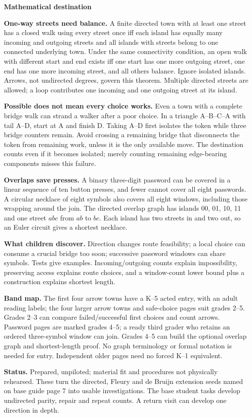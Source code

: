 \documentclass[11pt]{article}
\newcommand{\parttitle}[1]{{\large\bfseries\color{ink}#1}\par}
\newcommand{\labelled}[2]{\textbf{#1} #2\par}
\begin{document}
\parttitle{Mathematical destination}
\labelled{One-way streets need balance.}{A finite directed town with at least one street has a closed walk using every street once iff each island has equally many incoming and outgoing streets and all islands with streets belong to one connected underlying town. Under the same connectivity condition, an open walk with different start and end exists iff one start has one more outgoing street, one end has one more incoming street, and all others balance. Ignore isolated islands. Arrows, not undirected degrees, govern this theorem. Multiple directed streets are allowed; a loop contributes one incoming and one outgoing street at its island.}
\labelled{Possible does not mean every choice works.}{Even a town with a complete bridge walk can strand a walker after a poor choice. In a triangle A--B--C--A with tail A--D, start at A and finish D. Taking A--D first isolates the token while three bridge counters remain. Avoid crossing a remaining bridge that disconnects the token from remaining work, unless it is the only available move. The destination counts even if it becomes isolated; merely counting remaining edge-bearing components misses this failure.}
\labelled{Overlaps save presses.}{A binary three-digit password can be covered in a linear sequence of ten button presses, and fewer cannot cover all eight passwords. A circular necklace of eight symbols also covers all eight windows, including those wrapping around the join. The directed overlap graph has islands 00, 01, 10, 11 and one street $abc$ from $ab$ to $bc$. Each island has two streets in and two out, so an Euler circuit gives a shortest necklace.}
\labelled{What children discover.}{Direction changes route feasibility; a local choice can consume a crucial bridge too soon; successive password windows can share symbols. Tests give examples. Incoming/outgoing counts explain impossibility, preserving access explains route choices, and a window-count lower bound plus a construction explains shortest length.}
\labelled{Band map.}{The first four arrow towns have a K--5 acted entry, with an adult reading labels; the four larger arrow towns and safe-choice pages suit grades 2--5. Grades 2--3 can compare failed/successful first choices and count arrows. Password pages are marked grades 4--5; a ready third grader who retains an ordered three-symbol window can join. Grades 4--5 can build the optional overlap graph and shortest-length proof. No graph terminology or formal notation is needed for entry. Independent older pages need no forced K--1 equivalent.}
\labelled{Status.}{Prepared, unpiloted; material fit and procedures not physically rehearsed. These turn the directed, Fleury and de Bruijn extension seeds named on base guide page 7 into usable investigations. The base student tasks develop undirected parity, repair and repeat counts. A return visit can develop one direction in depth.}
\end{document}
